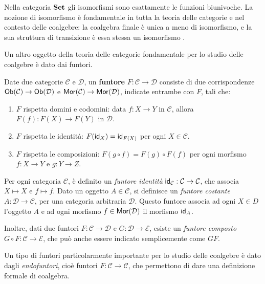Nella categoria \(\operatorname{\mathbf{Set}}\) gli isomorfismi sono esattamente le funzioni biunivoche. La nozione di isomorfismo è fondamentale in tutta la teoria delle categorie e nel contesto delle coalgebre: la coalgebra finale è unica a meno di isomorfismo, e la sua struttura di transizione è essa stessa un isomorfismo \cite{jacobs2017}.

Un altro oggetto della teoria delle categorie fondamentale per lo studio delle coalgebre è dato dai funtori.

\begin{definition}[Funtore]
  Date due categorie \(\mathcal{C}\) e \(\mathcal{D}\), un \textbf{funtore} \(F: \mathcal{C} \to \mathcal{D}\) consiste di due corrispondenze \(\operatorname{\operatorname{\mathsf{Ob}}}(\mathcal{C}) \to \operatorname{\operatorname{\mathsf{Ob}}}(\mathcal{D})\) e \(\operatorname{\operatorname{\mathsf{Mor}}}(\mathcal{C}) \to \operatorname{\operatorname{\mathsf{Mor}}}(\mathcal{D})\), indicate entrambe con \(F\), tali che:
  \begin{enumerate}
    \item \(F\) rispetta domini e codomini: data \(f: X \to Y\) in \(\mathcal{C}\), allora \(F(f): F(X) \to F(Y)\) in \(\mathcal{D}\).
    \item \(F\) rispetta le identità: \(F(\operatorname{\operatorname{\mathsf{id}}}_X) =  \operatorname{\operatorname{\mathsf{id}}}_{F(X)}\) per ogni \(X \in \mathcal{C}\).
    \item \(F\) rispetta le composizioni: \(F(g \circ f) = F(g) \circ F(f)\) per ogni morfismo \(f: X \to Y\) e \(g: Y \to Z\).
  \end{enumerate}
\end{definition}

Per ogni categoria \(\mathcal{C}\), è definito un \textit{funtore identità} \(\operatorname{\operatorname{\mathsf{id}}}_{\mathcal{C}}: \mathcal{C} \to \mathcal{C}\), che associa \(X \mapsto X\) e \(f \mapsto f\). Dato un oggetto \(A \in \mathcal{C}\), si definisce un \textit{funtore costante} \(\underbar{A}: \mathcal{D} \to \mathcal{C}\), per una categoria arbitraria \(\mathcal{D}\). Questo funtore associa ad ogni \(X \in D\) l'oggetto \(A\) e ad ogni morfismo \(f \in \operatorname{\operatorname{\mathsf{Mor}}}(\mathcal{D})\) il morfismo \(\operatorname{\operatorname{\mathsf{id}}}_A\).

Inoltre, dati due funtori \(F: \mathcal{C} \to \mathcal{D}\) e \(G: \mathcal{D} \to \mathcal{E}\), esiste un \textit{funtore composto} \(G \circ F: \mathcal{C} \to \mathcal{E}\), che può anche essere indicato semplicemente come \(GF\).

Un tipo di funtori particolarmente importante per lo studio delle coalgebre è dato dagli \textit{endofuntori}, cioè funtori \(F: \mathcal{C} \to \mathcal{C}\), che permettono di dare una definizione formale di coalgebra.

